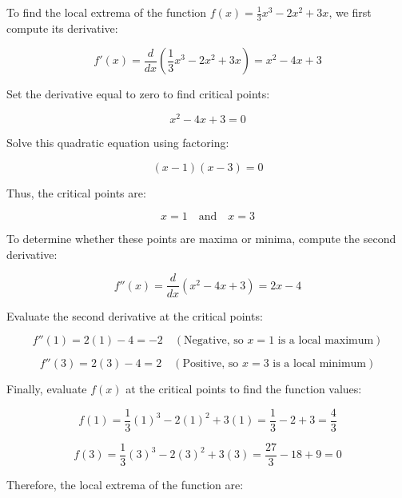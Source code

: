 \documentclass{article}
\begin{document}
To find the local extrema of the function \( f(x) = \frac{1}{3}x^3 - 2x^2 + 3x \), we first compute its derivative:

\[
f'(x) = \frac{d}{dx} \left( \frac{1}{3}x^3 - 2x^2 + 3x \right) = x^2 - 4x + 3
\]

Set the derivative equal to zero to find critical points:

\[
x^2 - 4x + 3 = 0
\]

Solve this quadratic equation using factoring:

\[
(x - 1)(x - 3) = 0
\]

Thus, the critical points are:

\[
x = 1 \quad \text{and} \quad x = 3
\]

To determine whether these points are maxima or minima, compute the second derivative:

\[
f''(x) = \frac{d}{dx} (x^2 - 4x + 3) = 2x - 4
\]

Evaluate the second derivative at the critical points:

\[
f''(1) = 2(1) - 4 = -2 \quad (\text{Negative, so } x = 1 \text{ is a local maximum})
\]

\[
f''(3) = 2(3) - 4 = 2 \quad (\text{Positive, so } x = 3 \text{ is a local minimum})
\]

Finally, evaluate \( f(x) \) at the critical points to find the function values:

\[
f(1) = \frac{1}{3}(1)^3 - 2(1)^2 + 3(1) = \frac{1}{3} - 2 + 3 = \frac{4}{3}
\]

\[
f(3) = \frac{1}{3}(3)^3 - 2(3)^2 + 3(3) = \frac{27}{3} - 18 + 9 = 0
\]

Therefore, the local extrema of the function are:
\end{document}
